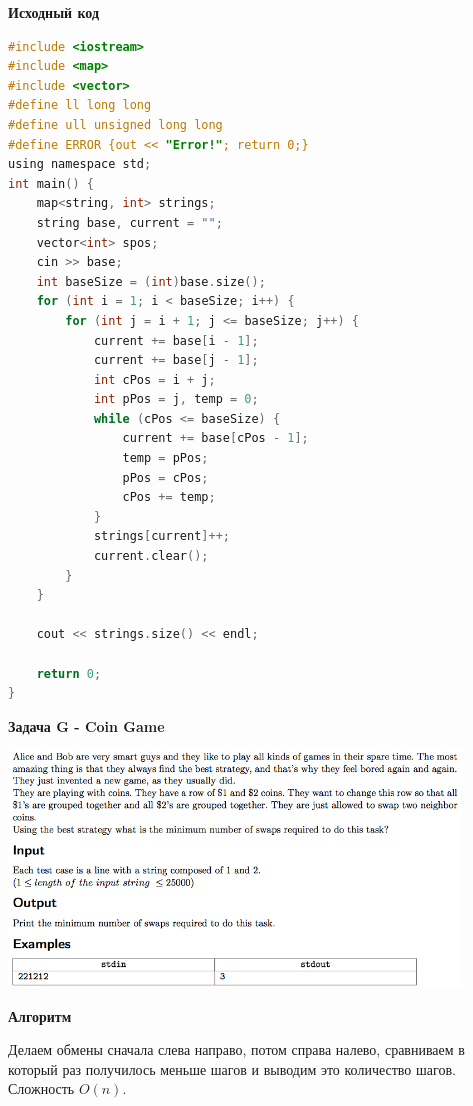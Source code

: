 \documentclass[a4paper,12pt]{article}
\begin{document}
\newpage
\textbf{{\large Исходный код}} \\
\begin{lstlisting}[language=C]
#include <iostream>
#include <map>
#include <vector>
#define ll long long
#define ull unsigned long long
#define ERROR {out << "Error!"; return 0;}
using namespace std;
int main() {
    map<string, int> strings;
    string base, current = "";
    vector<int> spos;
    cin >> base;
    int baseSize = (int)base.size();
    for (int i = 1; i < baseSize; i++) {
        for (int j = i + 1; j <= baseSize; j++) {
            current += base[i - 1];
            current += base[j - 1];
            int cPos = i + j;
            int pPos = j, temp = 0;
            while (cPos <= baseSize) {
                current += base[cPos - 1];
                temp = pPos;
                pPos = cPos;
                cPos += temp;
            }
            strings[current]++;
            current.clear();
        }
    }

    cout << strings.size() << endl;

    return 0;
}
\end{lstlisting}

\newpage
\textbf{{\large Задача G - Coin Game}}

\begin{center}
\includegraphics[width=0.9\textwidth]{CT_S02E10/CT_S02E10_G.png}\\ [1cm]
\end{center}

\textbf{{\large Алгоритм}}

Делаем обмены сначала слева направо, потом справа налево, сравниваем в который раз получилось меньше шагов и выводим это количество шагов. Сложность $O(n)$.
\end{document}
